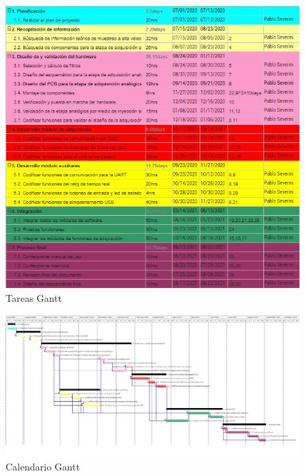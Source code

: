 \documentclass[11pt]{charter}
\begin{document}
\begin{figure}[htpb]
\centering 
\includegraphics[width=1\textwidth]{./Figuras/tablaGant.png}
\caption{Tareas Gantt}
\label{fig:AoN}
\end{figure}

\begin{landscape}
\begin{figure}[htpb]
\centering 
\includegraphics[width=1.6\textwidth]{./Figuras/calendarioGant.png}
\caption{Calendario Gantt}
\label{fig:AoN}
\end{figure}
\end{landscape}
\end{document}
